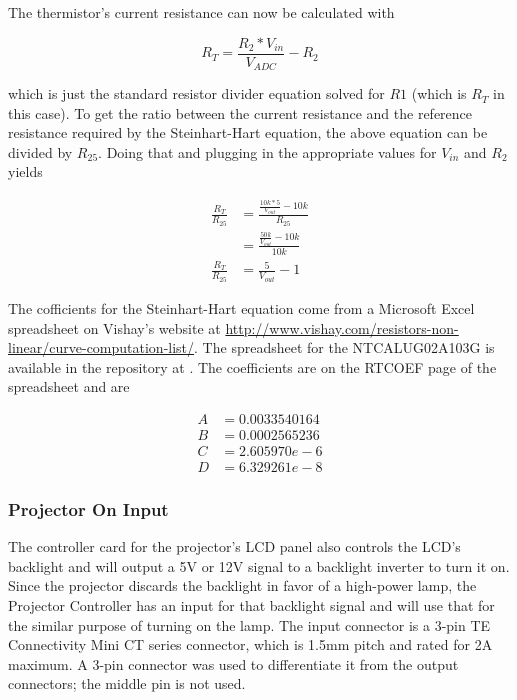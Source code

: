 \documentclass{article}
\begin{document}
The thermistor's current resistance can now be calculated with

\[
R_T = \frac{R_2*V_{in}}{V_{ADC}} - R_2
\]

which is just the standard resistor divider equation solved for $R1$ (which is $R_T$ in this case).
To get the ratio between the current resistance and the reference resistance required by the 
Steinhart-Hart equation, the above equation can be divided by $R_{25}$.  Doing that and plugging in
the appropriate values for $V_{in}$ and $R_2$ yields

\begin{align*}
    \frac{R_T}{R_{25}} &= \frac{\frac{10k * 5}{V_{out}} - 10k}{R_{25}} \\
    &= \frac{\frac{50k}{V_{out}} - 10k}{10k} \\
    \frac{R_T}{R_{25}} &= \frac{5}{V_{out}} - 1
\end{align*}

The cofficients for the Steinhart-Hart equation come from a Microsoft Excel spreadsheet on Vishay's
website at \url{http://www.vishay.com/resistors-non-linear/curve-computation-list/}.  The
spreadsheet for the NTCALUG02A103G is available in the repository at
.  The coefficients are on the RTCOEF page of the
spreadsheet and are

\begin{align*}
    A &= 0.0033540164 \\
    B &= 0.0002565236 \\
    C &= 2.605970e-6 \\
    D &= 6.329261e-8
\end{align*}

\subsubsection{Projector On Input} \label{sssec:PJOnInput}
The controller card for the projector's LCD panel also controls the LCD's backlight and will output
a 5V or 12V signal to a backlight inverter to turn it on.  Since the projector discards the
backlight in favor of a high-power lamp, the Projector Controller has an input for that backlight
signal and will use that for the similar purpose of turning on the lamp.  The input connector is a
3-pin TE Connectivity Mini CT series connector, which is 1.5mm pitch and rated for 2A maximum.  A
3-pin connector was used to differentiate it from the output connectors; the middle pin is not used.
\end{document}
